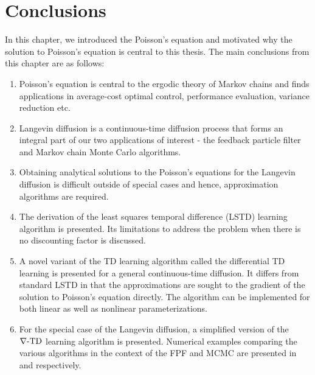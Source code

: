\section{Conclusions}
In this chapter, we introduced the Poisson's equation and motivated why the solution to Poisson's equation is central to this thesis. The main conclusions from this chapter are as follows:
\begin{enumerate}
	\item Poisson's equation is central to the ergodic theory of Markov chains and finds applications in average-cost optimal control, performance evaluation, variance reduction etc. 
	\item Langevin diffusion is a continuous-time diffusion process that forms an integral part of our two applications of interest - the feedback particle filter and Markov chain Monte Carlo algorithms. 
	\item Obtaining analytical solutions to the Poisson's equations for the Langevin diffusion is difficult outside of special cases and hence, approximation algorithms are required. 
	\item The derivation of the least squares temporal difference (LSTD) learning algorithm is presented. Its limitations to address the problem when there is no discounting factor is discussed. 
	\item A novel variant of the TD learning algorithm called the differential TD learning is presented for a general continuous-time diffusion. It differs from standard LSTD in that the approximations are sought to the gradient of the solution to Poisson's equation directly. The algorithm can be implemented for both linear as well as nonlinear parameterizations. 
	\item For the special case of the Langevin diffusion, a simplified version of the $\nabla\text{-TD}$ learning algorithm is presented. Numerical examples comparing the various algorithms in the context of the FPF and MCMC are presented in  and  respectively. 

\end{enumerate}




